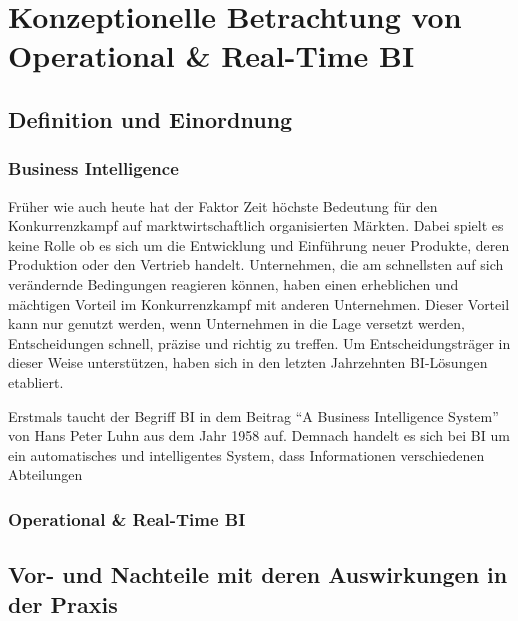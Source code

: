 \chapter{Konzeptionelle Betrachtung von Operational \& Real-Time BI}
\section{Definition und Einordnung}
\subsection{Business Intelligence}
Früher wie auch heute hat der Faktor Zeit höchste Bedeutung für den Konkurrenzkampf auf marktwirtschaftlich organisierten Märkten. Dabei spielt es keine Rolle ob es sich um die Entwicklung und Einführung neuer Produkte, deren Produktion oder den Vertrieb handelt. Unternehmen, die am schnellsten auf sich verändernde Bedingungen reagieren können, haben einen erheblichen und mächtigen Vorteil im Konkurrenzkampf mit anderen Unternehmen. \autocite[Vgl.][S. 1]{Stalk1988} Dieser Vorteil kann nur genutzt werden, wenn Unternehmen in die Lage versetzt werden, Entscheidungen schnell, präzise und richtig zu treffen. Um Entscheidungsträger in dieser Weise unterstützen, haben sich in den letzten Jahrzehnten \ac{BI}-Lösungen etabliert.

Erstmals taucht der Begriff \ac{BI} in dem Beitrag \enquote{A Business Intelligence System} von Hans Peter Luhn aus dem Jahr 1958 auf. Demnach handelt es sich bei \ac{BI} um ein automatisches und intelligentes System, dass Informationen verschiedenen Abteilungen 
\subsection{Operational \& Real-Time BI}
\section{Vor- und Nachteile mit deren Auswirkungen in der Praxis}
